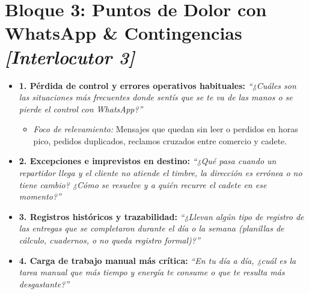 \documentclass[11pt,a4paper]{article}
\begin{document}
\section*{Bloque 3: Puntos de Dolor con WhatsApp \& Contingencias \hfill \normalfont\small\itshape [Interlocutor 3]}
\begin{itemize}
  \item \textbf{1. Pérdida de control y errores operativos habituales:}
  \textit{``¿Cuáles son las situaciones más frecuentes donde sentís que se te va de las manos o se pierde el control con WhatsApp?''}
  \begin{itemize}[label=$\circ$]
    \item \textit{Foco de relevamiento:} Mensajes que quedan sin leer o perdidos en horas pico, pedidos duplicados, reclamos cruzados entre comercio y cadete.
  \end{itemize}

  \item \textbf{2. Excepciones e imprevistos en destino:}
  \textit{``¿Qué pasa cuando un repartidor llega y el cliente no atiende el timbre, la dirección es errónea o no tiene cambio? ¿Cómo se resuelve y a quién recurre el cadete en ese momento?''}

  \item \textbf{3. Registros históricos y trazabilidad:}
  \textit{``¿Llevan algún tipo de registro de las entregas que se completaron durante el día o la semana (planillas de cálculo, cuadernos, o no queda registro formal)?''}

  \item \textbf{4. Carga de trabajo manual más crítica:}
  \textit{``En tu día a día, ¿cuál es la tarea manual que más tiempo y energía te consume o que te resulta más desgastante?''}
\end{itemize}

\end{document}
